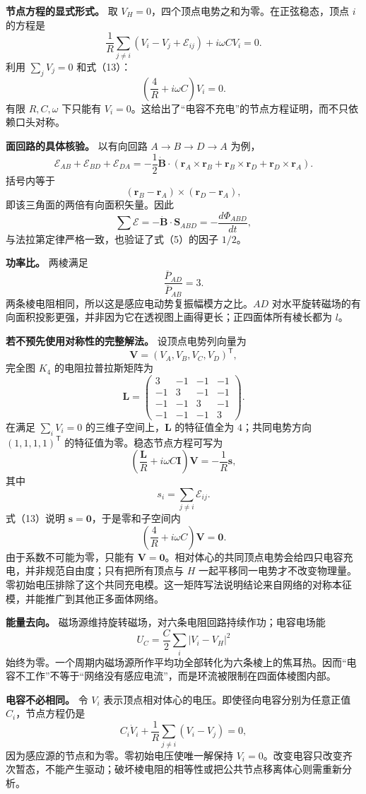 \documentclass[12pt,a4paper,UTF8]{ctexart}
\begin{document}
\textbf{节点方程的显式形式。} 取
\(V_H=0\)，四个顶点电势之和为零。在正弦稳态，顶点 \(i\) 的方程是 \[
\frac1R\sum_{j\ne i}(V_i-V_j+\mathcal E_{ij})
+i\omega CV_i=0.
\] 利用 \(\sum_jV_j=0\) 和式（13）： \[
\left(\frac4R+i\omega C\right)V_i=0.
\] 有限 \(R,C,\omega\) 下只能有
\(V_i=0\)。这给出了``电容不充电''的节点方程证明，而不只依赖口头对称。

\textbf{面回路的具体核验。} 以有向回路 \(A\to B\to D\to A\) 为例， \[
\mathcal E_{AB}+\mathcal E_{BD}+\mathcal E_{DA}
=-\frac12\dot{\bm B}\cdot
\left(\bm r_A\times\bm r_B
+\bm r_B\times\bm r_D
+\bm r_D\times\bm r_A\right).
\] 括号内等于 \[
(\bm r_B-\bm r_A)\times(\bm r_D-\bm r_A),
\] 即该三角面的两倍有向面积矢量。因此 \[
\sum\mathcal E=-\dot{\bm B}\cdot\bm S_{ABD}
=-\frac{d\Phi_{ABD}}{dt},
\] 与法拉第定律严格一致，也验证了式（5）的因子 \(1/2\)。

\textbf{功率比。} 两棱满足 \[
\frac{\overline P_{AD}}{\overline P_{AB}}=3.
\] 两条棱电阻相同，所以这是感应电动势复振幅模方之比。\(AD\)
对水平旋转磁场的有向面积投影更强，并非因为它在透视图上画得更长；正四面体所有棱长都为
\(l\)。

\textbf{若不预先使用对称性的完整解法。} 设顶点电势列向量为 \[
\bm V=(V_A,V_B,V_C,V_D)^{\mathsf T},
\] 完全图 \(K_4\) 的电阻拉普拉斯矩阵为 \[
\bm L=
\begin{pmatrix}
3&-1&-1&-1\\
-1&3&-1&-1\\
-1&-1&3&-1\\
-1&-1&-1&3
\end{pmatrix}.
\] 在满足 \(\sum_iV_i=0\) 的三维子空间上，\(\bm L\) 的特征值全为
\(4\)；共同电势方向 \((1,1,1,1)^{\mathsf T}\)
的特征值为零。稳态节点方程可写为 \[
\left(\frac{\bm L}{R}+i\omega C\bm I\right)\bm V
=-\frac1R\bm s,
\] 其中 \[
s_i=\sum_{j\ne i}\mathcal E_{ij}.
\] 式（13）说明 \(\bm s=\bm0\)，于是零和子空间内 \[
\left(\frac4R+i\omega C\right)\bm V=\bm0.
\] 由于系数不可能为零，只能有
\(\bm V=\bm0\)。相对体心的共同顶点电势会给四只电容充电，并非规范自由度；只有把所有顶点与
\(H\)
一起平移同一电势才不改变物理量。零初始电压排除了这个共同充电模。这一矩阵写法说明结论来自网络的对称本征模，并能推广到其他正多面体网络。

\textbf{能量去向。}
磁场源维持旋转磁场，对六条电阻回路持续作功；电容电场能 \[
U_C=\frac C2\sum_i|V_i-V_H|^2
\]
始终为零。一个周期内磁场源所作平均功全部转化为六条棱上的焦耳热。因而``电容不工作''不等于``网络没有感应电流''，而是环流被限制在四面体棱图内部。

\textbf{电容不必相同。} 令 \(V_i\)
表示顶点相对体心的电压。即使径向电容分别为任意正值 \(C_i\)，节点方程仍是
\[
C_i\dot V_i+\frac1R\sum_{j\ne i}(V_i-V_j)=0,
\] 因为感应源的节点和为零。零初始电压使唯一解保持
\(V_i=0\)。改变电容只改变齐次暂态，不能产生驱动；破坏棱电阻的相等性或把公共节点移离体心则需重新分析。
\end{document}
